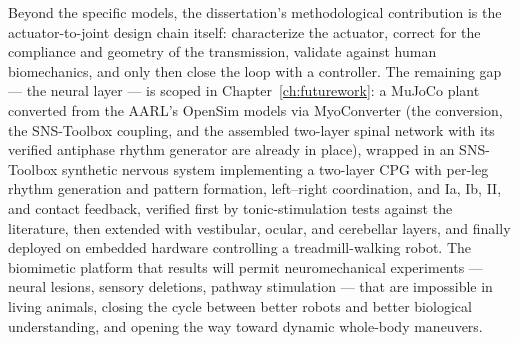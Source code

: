Beyond the specific models, the dissertation's methodological contribution is the actuator-to-joint design chain itself: characterize the actuator, correct for the compliance and geometry of the transmission, validate against human biomechanics, and only then close the loop with a controller. The remaining gap --- the neural layer --- is scoped in Chapter~\ref{ch:futurework}: a MuJoCo plant converted from the AARL's OpenSim models via MyoConverter (the conversion, the SNS-Toolbox coupling, and the assembled two-layer spinal network with its verified antiphase rhythm generator are already in place), wrapped in an SNS-Toolbox synthetic nervous system implementing a two-layer CPG with per-leg rhythm generation and pattern formation, left--right coordination, and Ia, Ib, II, and contact feedback, verified first by tonic-stimulation tests against the literature, then extended with vestibular, ocular, and cerebellar layers, and finally deployed on embedded hardware controlling a treadmill-walking robot. The biomimetic platform that results will permit neuromechanical experiments --- neural lesions, sensory deletions, pathway stimulation --- that are impossible in living animals, closing the cycle between better robots and better biological understanding, and opening the way toward dynamic whole-body maneuvers.
